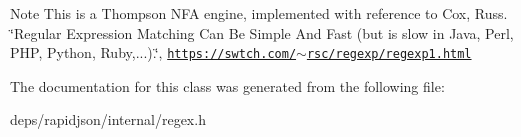 \begin{DoxyNote}{Note}
This is a Thompson N\+FA engine, implemented with reference to Cox, Russ. \char`\"{}\+Regular Expression Matching Can Be Simple And Fast (but is slow in Java, Perl, P\+H\+P, Python, Ruby,...).\char`\"{}, \href{https://swtch.com/~rsc/regexp/regexp1.html}{\tt https\+://swtch.\+com/$\sim$rsc/regexp/regexp1.\+html} 
\end{DoxyNote}


The documentation for this class was generated from the following file\+:\begin{DoxyCompactItemize}
\item 
deps/rapidjson/internal/regex.\+h\end{DoxyCompactItemize}
